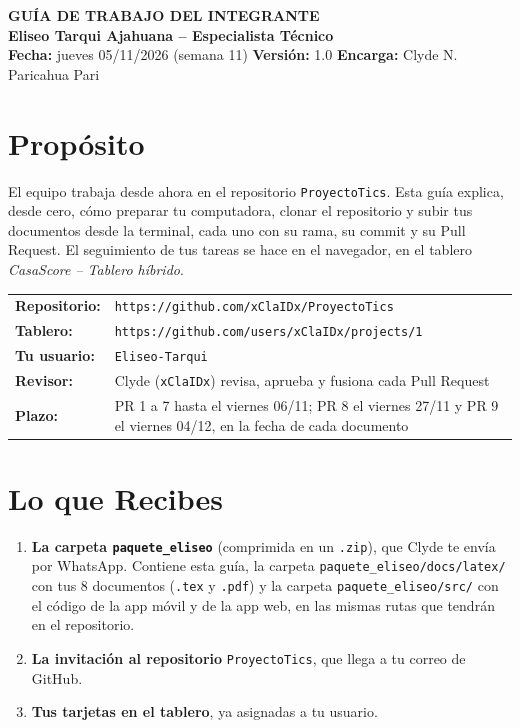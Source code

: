 \documentclass[11pt,a4paper]{article}
\begin{document}
\shorthandoff{<>}
\begin{center}
    {\Large \textbf{\textcolor{AzulUNA}{GUÍA DE TRABAJO DEL INTEGRANTE}}}\\[3pt]
    {\normalsize \textbf{Eliseo Tarqui Ajahuana -- Especialista Técnico}}\\[4pt]
    \footnotesize \textbf{Fecha:} jueves 05/11/2026 (semana 11) \quad \textbar\quad \textbf{Versión:} 1.0 \quad \textbar\quad \textbf{Encarga:} Clyde N. Paricahua Pari
\end{center}

\vspace{0.1cm}

\section{Propósito}
El equipo trabaja desde ahora en el repositorio \texttt{ProyectoTics}. Esta guía explica, desde cero, cómo preparar tu computadora, clonar el repositorio y subir tus documentos desde la terminal, cada uno con su rama, su commit y su Pull Request. El seguimiento de tus tareas se hace en el navegador, en el tablero \textit{CasaScore -- Tablero híbrido}.

\vspace{0.1cm}
\noindent\begin{tabularx}{\textwidth}{@{}P{3.6cm} L@{}}
\toprule
\textbf{Repositorio:} & \nolinkurl{https://github.com/xClaIDx/ProyectoTics} \\
\textbf{Tablero:} & \nolinkurl{https://github.com/users/xClaIDx/projects/1} \\
\textbf{Tu usuario:} & \texttt{Eliseo-Tarqui} \\
\textbf{Revisor:} & Clyde (\texttt{xClaIDx}) revisa, aprueba y fusiona cada Pull Request \\
\textbf{Plazo:} & PR 1 a 7 hasta el viernes 06/11; PR 8 el viernes 27/11 y PR 9 el viernes 04/12, en la fecha de cada documento \\
\bottomrule
\end{tabularx}

\section{Lo que Recibes}
\begin{enumerate}[leftmargin=*]
    \item \textbf{La carpeta \texttt{paquete\_eliseo}} (comprimida en un \texttt{.zip}), que Clyde te envía por WhatsApp. Contiene esta guía, la carpeta \nolinkurl{paquete_eliseo/docs/latex/} con tus 8 documentos (\texttt{.tex} y \texttt{.pdf}) y la carpeta \nolinkurl{paquete_eliseo/src/} con el código de la app móvil y de la app web, en las mismas rutas que tendrán en el repositorio.
    \item \textbf{La invitación al repositorio} \texttt{ProyectoTics}, que llega a tu correo de GitHub.
    \item \textbf{Tus tarjetas en el tablero}, ya asignadas a tu usuario.
\end{enumerate}
\end{document}

